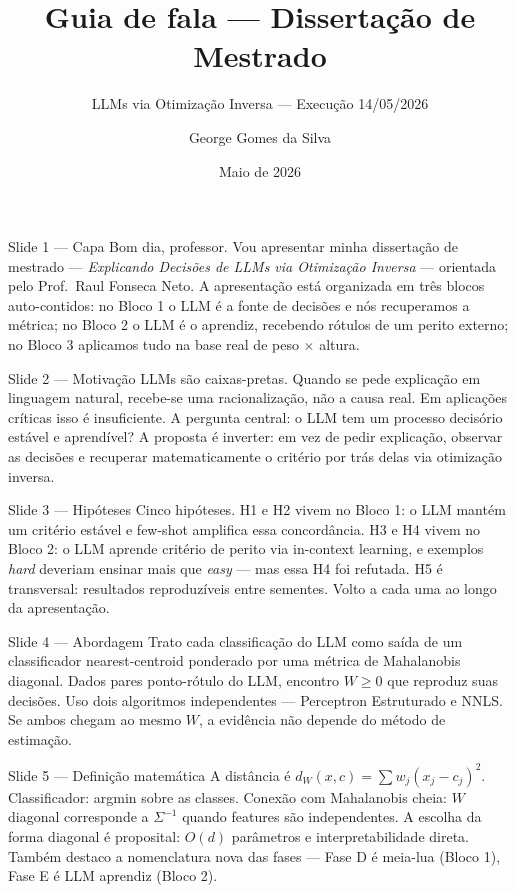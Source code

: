 \documentclass[aspectratio=169,10pt]{beamer}
\title[Guia de fala]{Guia de fala --- Disserta\c{c}\~ao de Mestrado}
\subtitle{LLMs via Otimiza\c{c}\~ao Inversa --- Execu\c{c}\~ao 14/05/2026}
\author{George Gomes da Silva}
\date{Maio de 2026}
\begin{document}

\begin{frame}{Slide 1 --- Capa}
\footnotesize
Bom dia, professor. Vou apresentar minha disserta\c{c}\~ao de mestrado --- \emph{Explicando Decis\~oes de LLMs via Otimiza\c{c}\~ao Inversa} --- orientada pelo Prof.\ Raul Fonseca Neto. A apresenta\c{c}\~ao est\'a organizada em tr\^es blocos auto-contidos: no Bloco 1 o LLM \'e a fonte de decis\~oes e n\'os recuperamos a m\'etrica; no Bloco 2 o LLM \'e o aprendiz, recebendo r\'otulos de um perito externo; no Bloco 3 aplicamos tudo na base real de peso $\times$ altura.
\end{frame}

\begin{frame}{Slide 2 --- Motiva\c{c}\~ao}
\footnotesize
LLMs s\~ao caixas-pretas. Quando se pede explica\c{c}\~ao em linguagem natural, recebe-se uma racionaliza\c{c}\~ao, n\~ao a causa real. Em aplica\c{c}\~oes cr\'iticas isso \'e insuficiente. A pergunta central: o LLM tem um processo decis\'orio est\'avel e aprend\'ivel? A proposta \'e inverter: em vez de pedir explica\c{c}\~ao, observar as decis\~oes e recuperar matematicamente o crit\'erio por tr\'as delas via otimiza\c{c}\~ao inversa.
\end{frame}

\begin{frame}{Slide 3 --- Hip\'oteses}
\footnotesize
Cinco hip\'oteses. H1 e H2 vivem no Bloco 1: o LLM mant\'em um crit\'erio est\'avel e few-shot amplifica essa concord\^ancia. H3 e H4 vivem no Bloco 2: o LLM aprende crit\'erio de perito via in-context learning, e exemplos \emph{hard} deveriam ensinar mais que \emph{easy} --- mas essa H4 foi refutada. H5 \'e transversal: resultados reproduz\'iveis entre sementes. Volto a cada uma ao longo da apresenta\c{c}\~ao.
\end{frame}

\begin{frame}{Slide 4 --- Abordagem}
\footnotesize
Trato cada classifica\c{c}\~ao do LLM como sa\'ida de um classificador nearest-centroid ponderado por uma m\'etrica de Mahalanobis diagonal. Dados pares ponto-r\'otulo do LLM, encontro $W \geq 0$ que reproduz suas decis\~oes. Uso dois algoritmos independentes --- Perceptron Estruturado e NNLS. Se ambos chegam ao mesmo $W$, a evid\^encia n\~ao depende do m\'etodo de estima\c{c}\~ao.
\end{frame}

\begin{frame}{Slide 5 --- Defini\c{c}\~ao matem\'atica}
\footnotesize
A dist\^ancia \'e $d_W(x,c) = \sum w_j (x_j - c_j)^2$. Classificador: argmin sobre as classes. Conex\~ao com Mahalanobis cheia: $W$ diagonal corresponde a $\Sigma^{-1}$ quando features s\~ao independentes. A escolha da forma diagonal \'e proposital: $O(d)$ par\^ametros e interpretabilidade direta. Tamb\'em destaco a nomenclatura nova das fases --- Fase D \'e meia-lua (Bloco 1), Fase E \'e LLM aprendiz (Bloco 2).
\end{frame}
\end{document}
